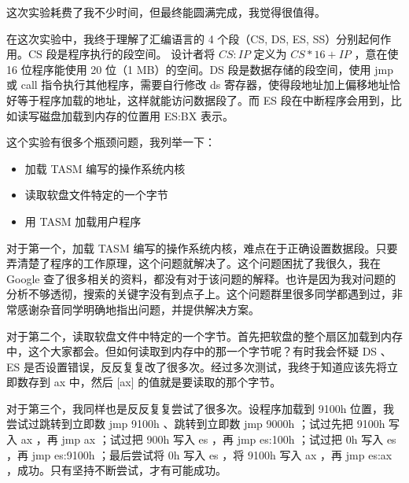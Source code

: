 \documentclass{article}
\begin{document}
这次实验耗费了我不少时间，但最终能圆满完成，我觉得很值得。

在这次实验中，我终于理解了汇编语言的 4 个段（CS, DS, ES, SS）分别起何作用。CS 段是程序执行的段空间。 设计者将 $CS:IP$ 定义为 $CS * 16 + IP$ ，意在使 16 位程序能使用 20 位（1 MB）的空间。DS 段是数据存储的段空间，使用 jmp 或 call 指令执行其他程序，需要自行修改 ds 寄存器，使得段地址加上偏移地址恰好等于程序加载的地址，这样就能访问数据段了。而 ES 段在中断程序会用到，比如读写磁盘加载到内存的位置用 ES:BX 表示。

这个实验有很多个瓶颈问题，我列举一下：

\begin{itemize}
\item 加载 TASM 编写的操作系统内核
\item 读取软盘文件特定的一个字节
\item 用 TASM 加载用户程序
\end{itemize}

对于第一个，加载 TASM 编写的操作系统内核，难点在于正确设置数据段。只要弄清楚了程序的工作原理，这个问题就解决了。这个问题困扰了我很久，我在 Google 查了很多相关的资料，都没有对于该问题的解释。也许是因为我对问题的分析不够透彻，搜索的关键字没有到点子上。这个问题群里很多同学都遇到过，非常感谢杂音同学明确地指出问题，并提供解决方案。

对于第二个，读取软盘文件中特定的一个字节。首先把软盘的整个扇区加载到内存中，这个大家都会。但如何读取到内存中的那一个字节呢？有时我会怀疑 DS 、 ES 是否设置错误，反反复复改了很多次。经过多次测试，我终于知道应该先将立即数存到 ax 中，然后 [ax] 的值就是要读取的那个字节。

对于第三个，我同样也是反反复复尝试了很多次。设程序加载到 9100h 位置，我尝试过跳转到立即数 jmp 9100h 、跳转到立即数 jmp 9000h ；试过先把 9100h 写入 ax ，再 jmp ax ；试过把 900h 写入 es ，再 jmp es:100h ；试过把 0h 写入 es ，再 jmp es:9100h ；最后尝试将 0h 写入 es ，将 9100h 写入 ax ，再 jmp es:ax ，成功。只有坚持不断尝试，才有可能成功。
\end{document}
